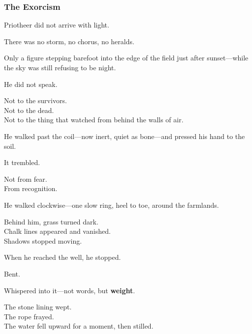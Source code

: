 \documentclass[12pt]{article}
\begin{document}
\subsubsection*{The Exorcism}

Priotheer did not arrive with light.

\vspace{0.5em}
There was no storm, no chorus, no heralds.

\vspace{0.5em}
Only a figure stepping barefoot into the edge of the field just after sunset---while the sky was still refusing to be night.

\vspace{0.5em}
He did not speak.

\vspace{0.5em}
Not to the survivors.\\
Not to the dead.\\
Not to the thing that watched from behind the walls of air.

\vspace{0.5em}
He walked past the coil---now inert, quiet as bone---and pressed his hand to the soil.

\vspace{0.5em}
It trembled.

\vspace{0.5em}
Not from fear.\\
From recognition.

\vspace{0.5em}
He walked clockwise---one slow ring, heel to toe, around the farmlands.

\vspace{0.5em}
Behind him, grass turned dark.\\
Chalk lines appeared and vanished.\\
Shadows stopped moving.

\vspace{0.5em}
When he reached the well, he stopped.

\vspace{0.5em}
Bent.

\vspace{0.5em}
Whispered into it---not words, but \textbf{weight}.

\vspace{0.5em}
The stone lining wept.\\
The rope frayed.\\
The water fell upward for a moment, then stilled.
\end{document}
